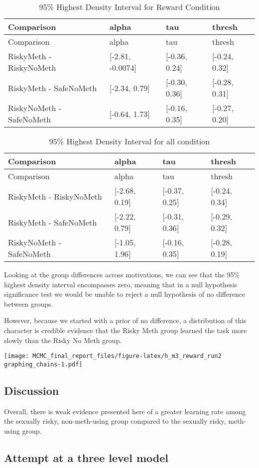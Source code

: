 \documentclass[]{article}
\begin{document}
\begin{longtable}[]{@{}llll@{}}
\caption{95\% Highest Density Interval for Reward
Condition}\tabularnewline
\toprule
Comparison & alpha & tau & thresh\tabularnewline
\midrule
\endfirsthead
\toprule
Comparison & alpha & tau & thresh\tabularnewline
\midrule
\endhead
RiskyMeth - RiskyNoMeth & {[}-2.81, -0.0074{]} & {[}-0.36, 0.24{]} &
{[}-0.24, 0.32{]}\tabularnewline
RiskyMeth - SafeNoMeth & {[}-2.34, 0.79{]} & {[}-0.30, 0.36{]} &
{[}-0.28, 0.31{]}\tabularnewline
RiskyNoMeth - SafeNoMeth & {[}-0.64, 1.73{]} & {[}-0.16, 0.35{]} &
{[}-0.27, 0.20{]}\tabularnewline
\bottomrule
\end{longtable}

\begin{longtable}[]{@{}llll@{}}
\caption{95\% Highest Density Interval for all condition}\tabularnewline
\toprule
Comparison & alpha & tau & thresh\tabularnewline
\midrule
\endfirsthead
\toprule
Comparison & alpha & tau & thresh\tabularnewline
\midrule
\endhead
RiskyMeth - RiskyNoMeth & {[}-2.68, 0.19{]} & {[}-0.37, 0.25{]} &
{[}-0.24, 0.34{]}\tabularnewline
RiskyMeth - SafeNoMeth & {[}-2.22, 0.79{]} & {[}-0.31, 0.36{]} &
{[}-0.29, 0.32{]}\tabularnewline
RiskyNoMeth - SafeNoMeth & {[}-1.05, 1.96{]} & {[}-0.16, 0.35{]} &
{[}-0.28, 0.19{]}\tabularnewline
\bottomrule
\end{longtable}

Looking at the group differences across motivations, we can see that the
95\% highest density interval encompasses zero, meaning that in a null
hypothesis significance test we would be unable to reject a null
hypothesis of no difference between groups.

However, because we started with a prior of no difference, a
distribution of this character is credible evidence that the Risky Meth
group learned the task more slowly than the Risky No Meth group.

\texttt{[image: MCMC\_final\_report\_files/figure-latex/h\_m3\_reward\_run2 graphing\_chains-1.pdf]}

\subsection{Discussion}\label{discussion}

Overall, there is weak evidence presented here of a greater learning
rate among the sexually risky, non-meth-using group compared to the
sexually risky, meth-using group.

\subsection{Attempt at a three level
model}\label{attempt-at-a-three-level-model}
\end{document}

